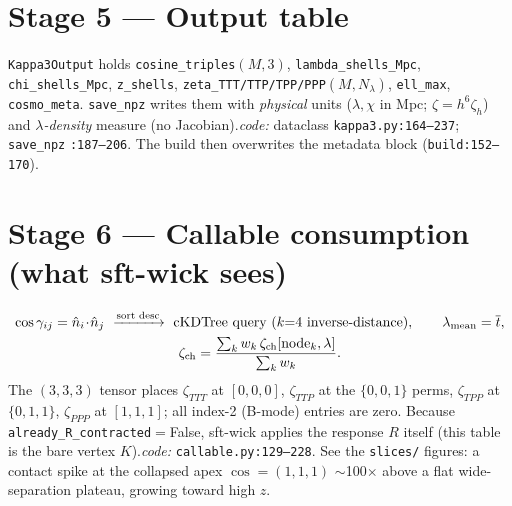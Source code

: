 \documentclass[11pt]{article}
\newcommand{\code}[1]{\texttt{\footnotesize #1}}
\newcommand{\chh}{\chi}
\newcommand{\lam}{\lambda}
\begin{document}
\section{Stage 5 --- Output table}
\code{Kappa3Output} holds \texttt{cosine\_triples}$(M,3)$, \texttt{lambda\_shells\_Mpc},
\texttt{chi\_shells\_Mpc}, \texttt{z\_shells}, \texttt{zeta\_TTT/TTP/TPP/PPP}$(M,N_\lam)$,
\texttt{ell\_max}, \texttt{cosmo\_meta}. \code{save\_npz} writes them with
\emph{physical} units ($\lam,\chh$ in Mpc; $\zeta=h^6\zeta_h$) and \emph{$\lam$-density}
measure (no Jacobian).\quad \textit{code:} dataclass \code{kappa3.py:164--237};
\code{save\_npz} \code{:187--206}. The build then overwrites the metadata block
(\code{build:152--170}).

\section{Stage 6 --- Callable consumption (what sft-wick sees)}
\begin{gather}
\cos\gamma_{ij}=\hat n_i\!\cdot\!\hat n_j\ \xrightarrow{\text{sort desc}}\
\text{cKDTree query }(k{=}4\ \text{inverse-distance}),\qquad
\lam_{\mathrm{mean}}=\overline{t},\notag\\
\zeta_{\mathrm{ch}}=\frac{\sum_k w_k\,\zeta_{\mathrm{ch}}[\text{node}_k,\lam]}{\sum_k w_k}.
\end{gather}
The $(3,3,3)$ tensor places
$\zeta_{TTT}$ at $[0,0,0]$, $\zeta_{TTP}$ at the $\{0,0,1\}$ perms, $\zeta_{TPP}$ at $\{0,1,1\}$,
$\zeta_{PPP}$ at $[1,1,1]$; all index-2 (B-mode) entries are zero. Because
\texttt{already\_R\_contracted}$=$False, sft-wick applies the response $R$ itself (this table is the
bare vertex $K$).\quad \textit{code:} \code{callable.py:129--228}. See the \texttt{slices/} figures:
a contact spike at the collapsed apex $\cos=(1,1,1)$ $\sim$100$\times$ above a flat
wide-separation plateau, growing toward high $z$.

\end{document}
